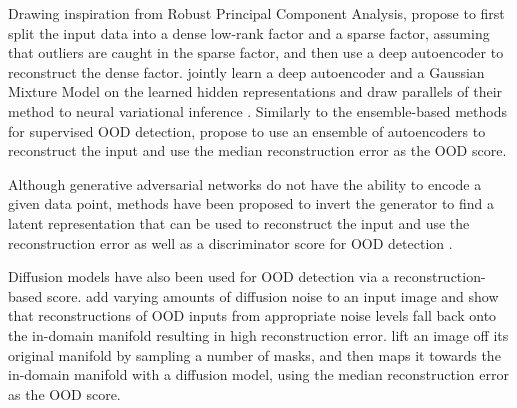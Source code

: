 Drawing inspiration from Robust Principal Component Analysis, \textcite{zhou_anomaly_2017} propose to first split the input data into a dense low-rank factor and a sparse factor, assuming that outliers are caught in the sparse factor, and then use a deep autoencoder to reconstruct the dense factor. 
\textcite{zong_deep_2018} jointly learn a deep autoencoder and a Gaussian Mixture Model on the learned hidden representations and draw parallels of their method to neural variational inference \parencite{mnih_neural_2014}. 
Similarly to the ensemble-based methods for supervised OOD detection, \textcite{chen_outlier_2017} propose to use an ensemble of autoencoders to reconstruct the input and use the median reconstruction error as the OOD score. 

Although generative adversarial networks do not have the ability to encode a given data point, methods have been proposed to invert the generator to find a latent representation that can be used to reconstruct the input and use the reconstruction error as well as a discriminator score for OOD detection \parencite{schlegl_unsupervised_2017,li_madgan_2019}. 

Diffusion models have also been used for OOD detection via a reconstruction-based score. \textcite{graham_denoising_2023} add varying amounts of diffusion noise to an input image and show that reconstructions of OOD inputs from appropriate noise levels fall back onto the in-domain manifold resulting in high reconstruction error. 
\textcite{liu_unsupervised_2023a} lift an image off its original manifold by sampling a number of masks, and then maps it towards the in-domain manifold with a diffusion model, using the median reconstruction error as the OOD score.



